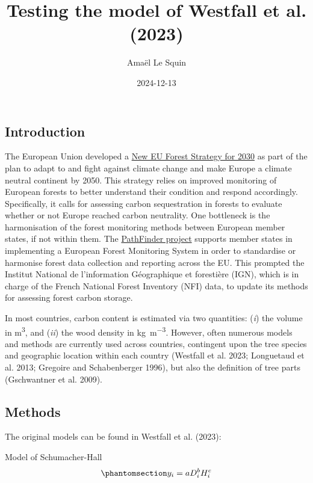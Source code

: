 \documentclass[
  letterpaper,
  DIV=11,
  numbers=noendperiod]{scrartcl}
\title{Testing the model of Westfall et al. (2023)}
\author{Amaël Le Squin}
\date{2024-12-13}
\begin{document}
\maketitle


\subsection{Introduction}\label{introduction}

The European Union developed a
\href{https://eur-lex.europa.eu/legal-content/EN/TXT/?uri=CELEX:52021DC0572}{New
EU Forest Strategy for 2030} as part of the plan to adapt to and fight
against climate change and make Europe a climate neutral continent by
2050. This strategy relies on improved monitoring of European forests to
better understand their condition and respond accordingly. Specifically,
it calls for assessing carbon sequestration in forests to evaluate
whether or not Europe reached carbon neutrality. One bottleneck is the
harmonisation of the forest monitoring methods between European member
states, if not within them. The
\href{https://pathfinder-heu.eu/\#top}{PathFinder project} supports
member states in implementing a European Forest Monitoring System in
order to standardise or harmonise forest data collection and reporting
across the EU. This prompted the Institut National de l'information
Géographique et forestière (IGN), which is in charge of the French
National Forest Inventory (NFI) data, to update its methods for
assessing forest carbon storage.

In most countries, carbon content is estimated via two quantities:
(\emph{i}) the volume in \unit{\cubic\metre}, and (\emph{ii}) the wood
density in \unit{\kilogram\per\cubic\metre}. However, often numerous
models and methods are currently used across countries, contingent upon
the tree species and geographic location within each country (Westfall
et al. 2023; Longuetaud et al. 2013; Gregoire and Schabenberger 1996),
but also the definition of tree parts (Gschwantner et al. 2009).

\subsection{Methods}\label{methods}

The original models can be found in Westfall et al. (2023):

Model of Schumacher-Hall
\begin{equation}\phantomsection\label{eq-schumacherHall}{
y_i = a D_i^b H_i^c
}\end{equation}
\end{document}
